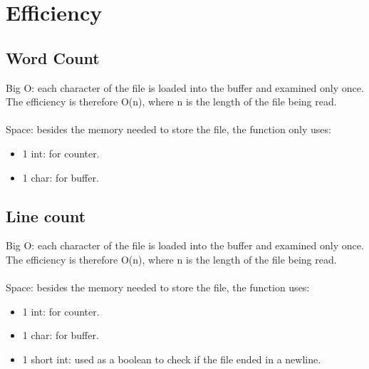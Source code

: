 \documentclass[letterpaper,12pt]{article}
\begin{document}
\section{Efficiency}
\subsection{Word Count}
Big O: each character of the file is loaded into the buffer and examined only once. The efficiency is therefore O(n), where n is the length of the file being read. \\ \\
Space: besides the memory needed to store the file, the function only uses: \\
\begin{itemize}
	\item 1 int: for counter.
	\item 1 char: for buffer.
\end{itemize}

\subsection{Line count}
Big O: each character of the file is loaded into the buffer and examined only once. The efficiency is therefore O(n), where n is the length of the file being read. \\ \\
Space: besides the memory needed to store the file, the function uses: \\
\begin{itemize}
	\item 1 int: for counter.
	\item 1 char: for buffer.
	\item 1 short int: used as a boolean to check if the file ended in a newline.
\end{itemize}
\end{document}
